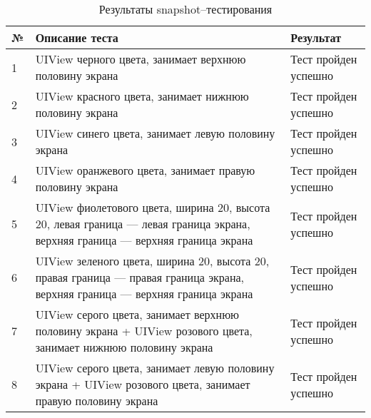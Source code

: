 \begin{table}[!htb]
 \caption{Результаты snapshot--тестирования}
 \label{table:tests1}
 \begin{center}
 \begin{tabular}{|p{0.6cm}|p{10cm}|p{5cm}|}
  \hline
   \bfseries № & \bfseries Описание теста & \bfseries Результат \\ \hline
   1 & UIView черного цвета, занимает верхнюю половину экрана & Тест пройден успешно  \\ \hline
   2 & UIView красного цвета, занимает нижнюю половину экрана & Тест пройден успешно  \\ \hline
   3 & UIView синего цвета, занимает левую половину экрана  & Тест пройден успешно  \\ \hline      
   4 & UIView оранжевого цвета, занимает правую половину экрана  & Тест пройден успешно  \\ \hline
   5 & UIView фиолетового цвета, ширина 20, высота 20, левая граница --- левая граница экрана, верхняя граница --- верхняя граница экрана & Тест пройден успешно  \\ \hline
   6 & UIView зеленого цвета, ширина 20, высота 20, правая граница --- правая граница экрана, верхняя граница --- верхняя граница экрана & Тест пройден успешно  \\ \hline
   7 & UIView серого цвета, занимает верхнюю половину экрана + UIView розового цвета, занимает нижнюю половину экрана & Тест пройден успешно  \\ \hline
   8 & UIView серого цвета, занимает левую половину экрана + UIView розового цвета, занимает правую половину экрана & Тест пройден успешно  \\ \hline
  \end{tabular}
 \end{center}
\end{table}

